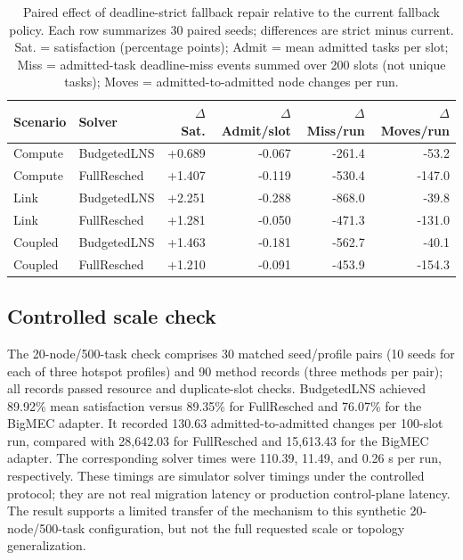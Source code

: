 \documentclass[preprint,12pt]{elsarticle}
\begin{document}
\begin{table}[H]
\centering
\caption{Paired effect of deadline-strict fallback repair relative to the current fallback policy. Each row summarizes 30 paired seeds; differences are strict minus current. Sat. = satisfaction (percentage points); Admit = mean admitted tasks per slot; Miss = admitted-task deadline-miss events summed over 200 slots (not unique tasks); Moves = admitted-to-admitted node changes per run.}
\label{tab:alternative-feasibility-rule}
\scriptsize
\setlength{\tabcolsep}{3pt}
\begin{tabular}{llrrrr}
\toprule
Scenario & Solver & $\Delta$ Sat. & $\Delta$ Admit/slot & $\Delta$ Miss/run & $\Delta$ Moves/run \\
\midrule
Compute & BudgetedLNS & +0.689 & -0.067 & -261.4 & -53.2 \\
Compute & FullResched & +1.407 & -0.119 & -530.4 & -147.0 \\
Link & BudgetedLNS & +2.251 & -0.288 & -868.0 & -39.8 \\
Link & FullResched & +1.281 & -0.050 & -471.3 & -131.0 \\
Coupled & BudgetedLNS & +1.463 & -0.181 & -562.7 & -40.1 \\
Coupled & FullResched & +1.210 & -0.091 & -453.9 & -154.3 \\
\bottomrule
\end{tabular}
\end{table}

\subsection{Controlled scale check}\label{controlled-scale-check}

The 20-node/500-task check comprises 30 matched seed/profile pairs (10 seeds for each of three hotspot profiles) and 90 method records (three methods per pair); all records passed resource and duplicate-slot checks. BudgetedLNS achieved 89.92\% mean
satisfaction versus 89.35\% for FullResched and 76.07\% for the BigMEC
adapter. It recorded 130.63 admitted-to-admitted changes per 100-slot run,
compared with 28,642.03 for FullResched and 15,613.43 for the BigMEC adapter.
The corresponding solver times were 110.39, 11.49, and 0.26 s per run,
respectively. These timings are simulator solver timings under the controlled
protocol; they are not real migration latency or production control-plane
latency. The result supports a limited transfer of the mechanism to this
synthetic 20-node/500-task configuration, but not the full requested scale or
topology generalization.
\end{document}
